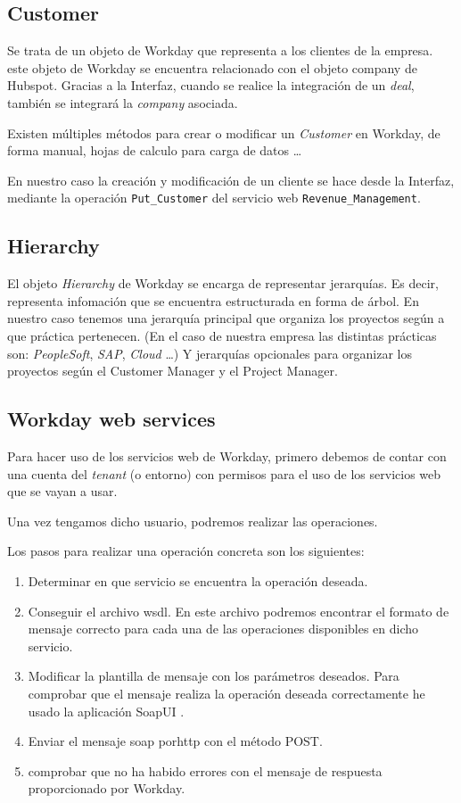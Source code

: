 \subsection{Customer}
Se trata de un objeto de Workday que representa a los clientes de la empresa. este objeto de Workday se encuentra relacionado con el objeto company de Hubspot. 
Gracias a la Interfaz, cuando se realice la integración de un \textit{deal}, también se integrará la \textit{company} asociada.

Existen múltiples métodos para crear o modificar un \textit{Customer} en Workday, de forma manual, hojas de calculo para carga de datos \ldots

En nuestro caso la creación y modificación de un cliente se hace desde la Interfaz, 
mediante la operación \verb|Put_Customer| del servicio web \verb|Revenue_Management|.

\subsection{Hierarchy}

El objeto \textit{Hierarchy} de Workday se encarga de representar jerarquías.
Es decir, representa infomación que se encuentra estructurada en forma de árbol.
En nuestro caso tenemos una jerarquía principal que organiza los proyectos según a que práctica pertenecen. 
(En el caso de nuestra empresa las distintas prácticas son: \textit{PeopleSoft}, \textit{SAP}, \textit{Cloud} \ldots)
Y jerarquías opcionales para organizar los proyectos según el Customer Manager y el Project Manager.

\subsection{Workday web services}

Para hacer uso de los servicios web de Workday, primero debemos de contar con una cuenta del \textit{tenant} (o entorno) con permisos para el uso de los servicios web que se vayan a usar.

Una vez tengamos dicho usuario, podremos realizar las operaciones.

Los pasos para realizar una operación concreta son los siguientes:

\begin{enumerate}
	\item Determinar en que servicio se encuentra la operación deseada.
	\item Conseguir el archivo \acrshort{wsdl}. En este archivo podremos encontrar el formato de mensaje correcto para cada una de las operaciones disponibles en dicho servicio.
	\item Modificar la plantilla de mensaje con los parámetros deseados. 
	Para comprobar que el mensaje realiza la operación deseada correctamente he usado la aplicación SoapUI \cite{soapui}.
	\item Enviar el mensaje \acrshort{soap} por\acrshort{http} con el método POST.
	\item comprobar que no ha habido errores con el mensaje de respuesta proporcionado por Workday.
\end{enumerate}



